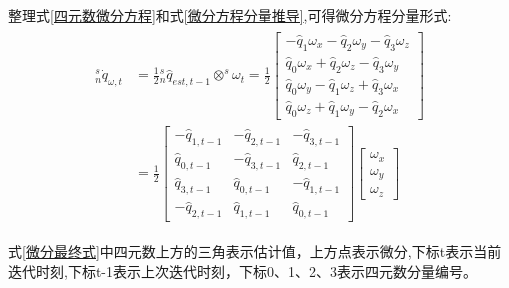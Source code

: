 整理式\ref{四元数微分方程}和式\ref{微分方程分量推导},可得微分方程分量形式:
\begin{eqnarray}
    \begin{aligned}
    ^s_n\dot{q}_{\omega,t}&=\frac{1}{2}{^s_n\hat{q}_{est,t-1}}\otimes^s\omega_t
    =\frac{1}{2}
    \left[\begin{array}{c}
            - \hat{q}_1\omega_x - \hat{q}_2 \omega_y - \hat{q}_3 \omega_z \\
              \hat{q}_0\omega_x + \hat{q}_2 \omega_z - \hat{q}_3 \omega_y \\
              \hat{q}_0\omega_y - \hat{q}_1 \omega_z + \hat{q}_3 \omega_x \\
              \hat{q}_0\omega_z + \hat{q}_1 \omega_y - \hat{q}_2 \omega_x
    \end{array}\right] \\
    &=\frac{1}{2}
    \left[ \begin{array}{rrr}
            -\hat{q}_{1,t-1} & -\hat{q}_{2,t-1} & -\hat{q}_{3,t-1} \\
             \hat{q}_{0,t-1} & -\hat{q}_{3,t-1} &  \hat{q}_{2,t-1} \\
             \hat{q}_{3,t-1} &  \hat{q}_{0,t-1} & -\hat{q}_{1,t-1} \\
            -\hat{q}_{2,t-1} &  \hat{q}_{1,t-1} &  \hat{q}_{0,t-1}
    \end{array} \right]
    \left[\begin{array}{c}
            \omega_{x} \\
            \omega_{y} \\
            \omega_{z}
    \end{array}\right] \label{微分最终式}
    \end{aligned}
\end{eqnarray}

式\ref{微分最终式}中四元数上方的三角表示估计值，上方点表示微分,下标t表示当前迭代时刻,下标t-1表示上次迭代时刻，下标0、1、2、3表示四元数分量编号。


